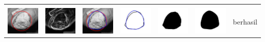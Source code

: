 \begin{table}[H]
\begin{tabular}{|m{0.7in}|m{0.7in}|m{0.7in}|m{0.7in}|m{0.7in}|m{0.7in}|m{0.7in}|}
		&  &  & & & &  \\
		\includegraphics[width=0.7in]{dataset/dataset_3/luka_kuning/ready/35_interp_init.jpg}&
		\includegraphics[width=0.7in]{dataset/dataset_3/luka_kuning/ready/35_interp_ext.jpg}&
		\includegraphics[width=0.7in]{dataset/dataset_3/luka_kuning/ready/35_interp_result.jpg}&
		\includegraphics[width=0.7in]{dataset/dataset_3/luka_kuning/ready/35_gt_r.jpg}&
		\includegraphics[width=0.7in]{dataset/dataset_3/luka_kuning/ready/35_r.jpg}&
		\includegraphics[width=0.7in]{dataset/dataset_3/luka_kuning/ready/35_interp_r.jpg}&
		berhasil\\
		\hline
		

\end{tabular}
\end{table}
